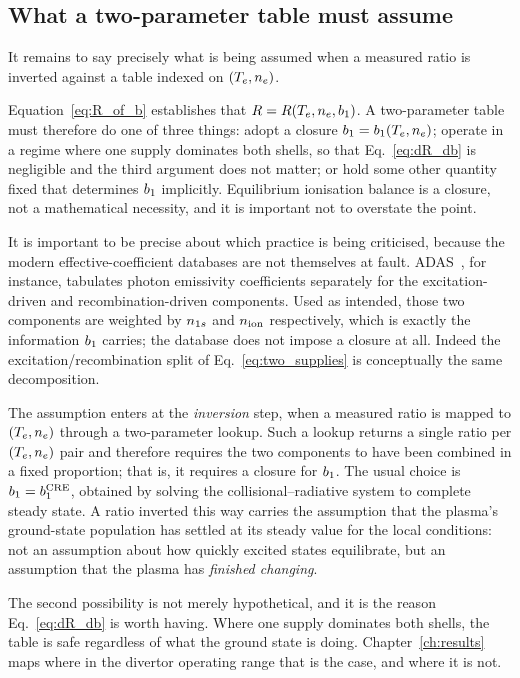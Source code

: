 \subsection{What a two-parameter table must assume}

It remains to say precisely what is being assumed when a measured ratio is
inverted against a table indexed on $(T_e,n_e)$.

Equation~\eqref{eq:R_of_b} establishes that $R = R(T_e,n_e,b_1)$.
A two-parameter table must therefore do one of three things: adopt a closure
$b_1 = b_1(T_e,n_e)$; operate in a regime where one supply dominates both
shells, so that Eq.~\eqref{eq:dR_db} is negligible and the third argument does
not matter; or hold some other quantity fixed that determines $b_1$
implicitly. Equilibrium ionisation balance is a closure, not a mathematical
necessity, and it is important not to overstate the point.

It is important to be precise about which practice is being criticised, because
the modern effective-coefficient databases are not themselves at fault.
ADAS~\cite{Summers2006}, for instance, tabulates photon emissivity coefficients
separately for the excitation-driven and recombination-driven components. Used
as intended, those two components are weighted by $n_{1s}$ and $n_{\mathrm{ion}}$
respectively, which is exactly the information $b_1$ carries; the database
does not impose a closure at all. Indeed the excitation/recombination split of
Eq.~\eqref{eq:two_supplies} is conceptually the same decomposition.

The assumption enters at the \emph{inversion} step, when a measured ratio is
mapped to $(T_e,n_e)$ through a two-parameter lookup. Such a lookup returns a
single ratio per $(T_e,n_e)$ pair and therefore requires the two components to
have been combined in a fixed proportion; that is, it requires a closure for
$b_1$. The usual choice is $b_1 = b_1^{\mathrm{CRE}}$, obtained by solving
the collisional--radiative system to complete steady state. A ratio inverted this
way carries the assumption that the plasma's ground-state population has settled
at its steady value for the local conditions: not an assumption about how quickly
excited states equilibrate, but an assumption that the plasma has \emph{finished
changing}.

The second possibility is not merely hypothetical, and it is the reason
Eq.~\eqref{eq:dR_db} is worth having. Where one supply dominates both shells,
the table is safe regardless of what the ground state is doing.
Chapter~\ref{ch:results} maps where in the divertor operating range that is the
case, and where it is not.

